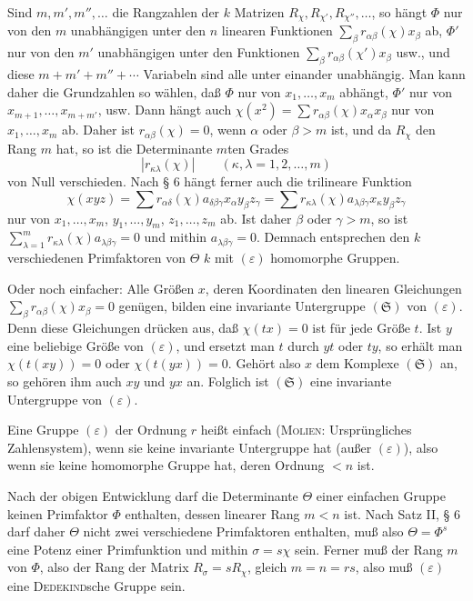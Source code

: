 \documentclass[11pt]{article}
\newcommand{\eps}{\varepsilon}
\begin{document}
Sind $m,m',m'',\ldots$ die Rangzahlen der $k$ Matrizen $R_\chi,R_{\chi'},R_{\chi''},\ldots$, so hängt $\Phi$ nur von den $m$ unabhängigen unter den $n$ linearen Funktionen $\sum_\beta r_{\alpha\beta}(\chi)x_\beta$ ab, $\Phi'$ nur von den $m'$ unabhängigen unter den Funktionen $\sum_\beta r_{\alpha\beta}(\chi')x_\beta$ usw., und diese $m+m'+m''+\cdots$ Variabeln sind alle unter einander unabhängig. Man kann daher die Grundzahlen so wählen, daß $\Phi$ nur von $x_1,\ldots,x_m$ abhängt, $\Phi'$ nur von $x_{m+1},\ldots,x_{m+m'}$, usw. Dann hängt auch $\chi(x^2)=\sum r_{\alpha\beta}(\chi)x_\alpha x_\beta$ nur von $x_1,\ldots,x_m$ ab. Daher ist $r_{\alpha\beta}(\chi)=0$, wenn $\alpha$ oder $\beta>m$ ist, und da $R_\chi$ den Rang $m$ hat, so ist die Determinante $m$ten Grades
\[
 |r_{\kappa\lambda}(\chi)|\qquad(\kappa,\lambda=1,2,
 \ldots,m)
\]
von Null verschieden. Nach § 6 hängt ferner auch die trilineare Funktion
\[
 \chi(xyz)=\sum r_{\alpha\delta}(\chi)a_{\delta\beta\gamma}x_\alpha y_\beta z_\gamma
 =\sum r_{\kappa\lambda}(\chi)a_{\lambda\beta\gamma}x_\kappa y_\beta z_\gamma
\]
nur von $x_1,\ldots,x_m$, $y_1,\ldots,y_m$, $z_1,\ldots,z_m$ ab. Ist daher $\beta$ oder $\gamma>m$, so ist $\sum_{\lambda=1}^m r_{\kappa\lambda}(\chi)a_{\lambda\beta\gamma}=0$ und mithin $a_{\lambda\beta\gamma}=0$. Demnach entsprechen den $k$ verschiedenen Primfaktoren von $\Theta$ $k$ mit $(\eps)$ homomorphe Gruppen.

Oder noch einfacher: Alle Größen $x$, deren Koordinaten den linearen Gleichungen $\sum_\beta r_{\alpha\beta}(\chi)x_\beta=0$ genügen, bilden eine invariante Untergruppe $(\mathfrak S)$ von $(\eps)$. Denn diese Gleichungen drücken aus, daß $\chi(tx)=0$ ist für jede Größe $t$. Ist $y$ eine beliebige Größe von $(\eps)$, und ersetzt man $t$ durch $yt$ oder $ty$, so erhält man $\chi(t(xy))=0$ oder $\chi(t(yx))=0$. Gehört also $x$ dem Komplexe $(\mathfrak S)$ an, so gehören ihm auch $xy$ und $yx$ an. Folglich ist $(\mathfrak S)$ eine invariante Untergruppe von $(\eps)$.

Eine Gruppe $(\eps)$ der Ordnung $r$ heißt einfach (\textsc{Molien}: Ursprüngliches Zahlensystem), wenn sie keine invariante Untergruppe hat (außer $(\eps)$), also wenn sie keine homomorphe Gruppe hat, deren Ordnung $<n$ ist.

Nach der obigen Entwicklung darf die Determinante $\Theta$ einer einfachen Gruppe keinen Primfaktor $\Phi$ enthalten, dessen linearer Rang $m<n$ ist. Nach Satz II, § 6 darf daher $\Theta$ nicht zwei verschiedene Primfaktoren enthalten, muß also $\Theta=\Phi^s$ eine Potenz einer Primfunktion und mithin $\sigma=s\chi$ sein. Ferner muß der Rang $m$ von $\Phi$, also der Rang der Matrix $R_\sigma=sR_\chi$, gleich $m=n=rs$, also muß $(\eps)$ eine \textsc{Dedekind}sche Gruppe sein.
\end{document}
